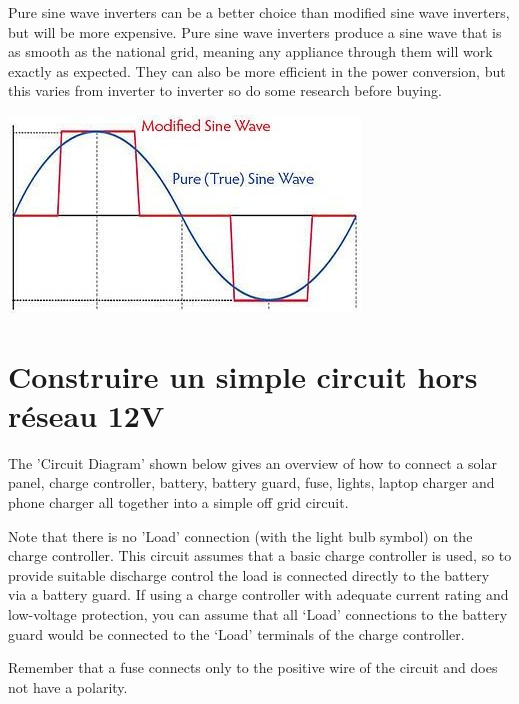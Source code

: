 \documentclass{article}
\theoremstyle{definition}
\theoremstyle{definition}
\theoremstyle{remark}
\begin{document}
    Pure sine wave inverters can be a better choice than modified sine wave inverters, but will be more expensive. Pure sine wave inverters produce a sine wave that is as smooth as the national grid, meaning any appliance through them will work exactly as expected. They can also be more efficient in the power conversion, but this varies from inverter to inverter so do some research before buying.

    \begin{center}
      \includegraphics[width=0.30\paperwidth]{Images/image_10_2_(sine_wave).png}
    \end{center}
  


{\color{blue}\section{Construire un simple circuit hors réseau 12V}} %
\label{sec:construire_un_simple_circuit_hors_reseau_12v}

  The 'Circuit Diagram' shown below gives an overview of how to connect a solar panel, charge controller, battery, battery guard, fuse, lights, laptop charger and phone charger all together into a simple off grid circuit. 

  Note that there is no 'Load' connection (with the light bulb symbol) on the charge controller. This circuit assumes that a basic charge controller is used, so to provide suitable discharge control the load is connected directly to the battery via a battery guard. If using a charge controller with adequate current rating and low-voltage protection, you can assume that all ‘Load’ connections to the battery guard would be connected to the ‘Load’ terminals of the charge controller.

  Remember that a fuse connects only to the positive wire of the circuit and does not have a polarity.
\end{document}
